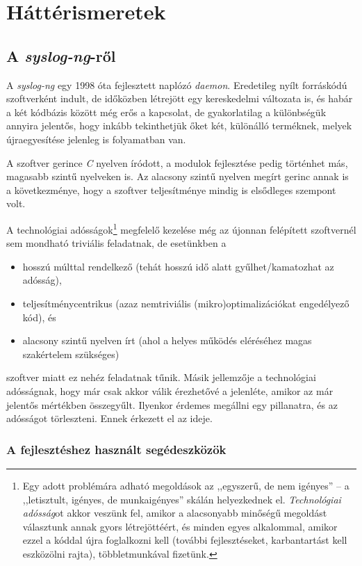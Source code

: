 \chapter{Háttérismeretek}

\section{A \emph{syslog-ng}-ről}

A \emph{syslog-ng} egy 1998 óta fejlesztett naplózó \emph{daemon}. Eredetileg nyílt forráskódú
szoftverként indult, de időközben létrejött egy kereskedelmi változata is, és habár a két kódbázis
között még erős a kapcsolat, de gyakorlatilag a különbségük annyira jelentős, hogy inkább
tekinthetjük őket két, különálló terméknek, melyek újraegyesítése jelenleg is folyamatban van.

A szoftver gerince \emph{C} nyelven íródott, a modulok fejlesztése pedig történhet más, magasabb
szintű nyelveken is. Az alacsony szintű nyelven megírt gerinc annak is a következménye, hogy
a szoftver teljesítménye mindig is elsődleges szempont volt.

A technológiai adósságok\footnote{Egy adott problémára adható megoldások az ,,egyszerű, de nem
    igényes'' -- a ,,letisztult, igényes, de munkaigényes'' skálán helyezkednek el.
    \emph{Technológiai adósság}ot akkor veszünk fel, amikor a alacsonyabb minőségű megoldást
    választunk annak gyors létrejöttéért, és minden egyes alkalommal, amikor ezzel a kóddal újra
foglalkozni kell (további fejlesztéseket, karbantartást kell eszközölni rajta), többletmunkával
fizetünk. } megfelelő kezelése még az újonnan felépített szoftvernél sem mondható triviális
feladatnak, de esetünkben a
\begin{itemize}
    \item hosszú múlttal rendelkező (tehát hosszú idő alatt gyűlhet/kamatozhat az adósság),
    \item teljesítménycentrikus (azaz nemtriviális (mikro)optimalizációkat engedélyező kód), és
    \item alacsony szintű nyelven írt (ahol a helyes működés eléréséhez magas szakértelem szükséges)
\end{itemize}
szoftver miatt ez nehéz feladatnak tűnik. Másik jellemzője a technológiai adósságnak, hogy már csak
akkor válik érezhetővé a jelenléte, amikor az már jelentős mértékben összegyűlt.  Ilyenkor érdemes
megállni egy pillanatra, és az adósságot törleszteni. Ennek érkezett el az ideje.

\subsection{A fejlesztéshez használt segédeszközök}

